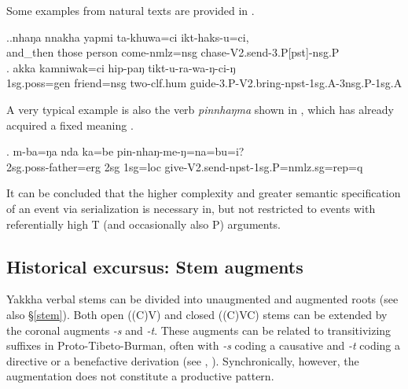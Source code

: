 Some examples from natural texts are provided in \Next.	

\ex.\ag.nhaŋa   nnakha yapmi ta-khuwa=ci       ikt-haks-u=ci,\\
and\_then those person come{\sc -nmlz=nsg} chase{\sc -V2.send-3.P[pst]-nsg.P}\\
 
 	\bg. akka  kamniwak=ci   hip-paŋ tikt-u-ra-wa-ŋ-ci-ŋ\\
{\sc 1sg.poss=gen} friend{\sc =nsg} two{\sc -clf.hum} guide{\sc -3.P-V2.bring-npst-1sg.A-3nsg.P-1sg.A}\\
	  
	
A very typical example is also the verb \emph{pinnhaŋma}  shown in \Next, which has already acquired a fixed meaning .

\exg. m-ba=ŋa nda ka=be pin-nhaŋ-me-ŋ=na=bu=i?\\
{\sc 2sg.poss}-father{\sc =erg} {\sc 2sg} {\sc 1sg=loc}	give{\sc -V2.send-npst-1sg.P=nmlz.sg=rep=q}\\

	
It can be concluded that the higher complexity and greater semantic specification of an event via serialization is necessary in, but not restricted to events with referentially high T (and occasionally also P) arguments.
	
\subsection{Historical excursus: Stem augments}\label{stemchange}

Yakkha verbal stems can be divided into unaugmented and augmented roots (see also §\ref{stem}). Both open ((C)V) and closed ((C)VC) stems can be extended by the coronal augments \emph{-s} and \emph{-t}. These augments can be related to transitivizing suffixes in Proto-Tibeto-Burman, often with \emph{-s} coding a causative and \emph{-t} coding a directive or a benefactive derivation (see \citet[457]{Matisoff2003Handbook}, \citet[160]{Driem1989_Reflexes}). Synchronically, however, the augmentation does not constitute a productive pattern. 

